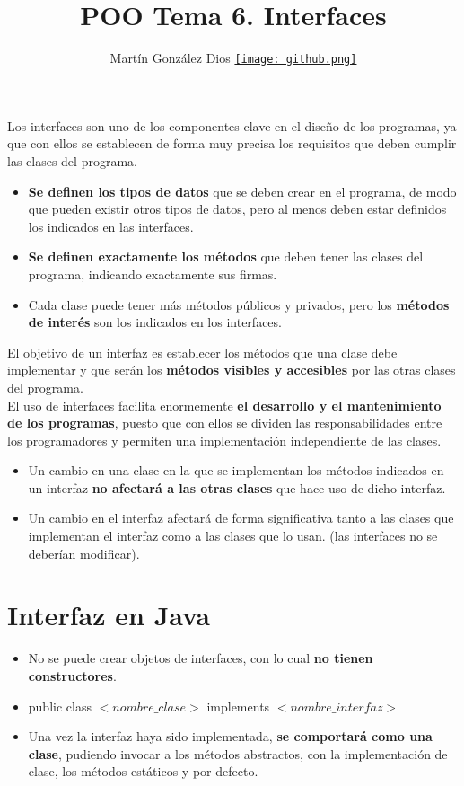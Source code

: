 \documentclass{article}
\title{POO Tema 6. Interfaces}
\author{Martín González Dios 
\href{https://github.com/martindios}{\texttt{[image: github.png]}}}
\begin{document}
\maketitle

Los interfaces son uno de los componentes clave en el diseño de los programas, ya que con ellos se establecen de forma muy precisa los requisitos que deben cumplir las clases del programa.
\begin{itemize}
    \item \textbf{Se definen los tipos de datos} que se deben crear en el programa, de modo que pueden existir otros tipos de datos, pero al menos deben estar definidos los indicados en las interfaces.
    \item \textbf{Se definen exactamente los métodos} que deben tener las clases del programa, indicando exactamente sus firmas.
    \item Cada clase puede tener más métodos públicos y privados, pero los \textbf{métodos de interés} son los indicados en los interfaces.
\end{itemize}

El objetivo de un interfaz es establecer los métodos que una clase debe implementar y que serán los \textbf{métodos visibles y accesibles} por las otras clases del programa. \\
 
El uso de interfaces facilita enormemente \textbf{el desarrollo y el mantenimiento de los programas}, puesto que con ellos se dividen las responsabilidades entre los programadores y permiten una implementación independiente de las clases.
\begin{itemize}
    \item Un cambio en una clase en la que se implementan los métodos indicados en un interfaz \textbf{no afectará a las otras clases} que hace uso de dicho interfaz.
    \item Un cambio en el interfaz afectará de forma significativa tanto a las clases que implementan el interfaz como a las clases que lo usan. (las interfaces no se deberían modificar).
\end{itemize}

\newpage

\section{Interfaz en Java}
\begin{itemize}
    \item No se puede crear objetos de interfaces, con lo cual \textbf{no tienen constructores}.
    \item public class $<nombre\_clase>$ implements $<nombre\_interfaz>$
    \item Una vez la interfaz haya sido implementada, \textbf{se comportará como una clase}, pudiendo invocar a los métodos abstractos, con la implementación de clase, los métodos estáticos y por defecto.
\end{itemize}
\end{document}
